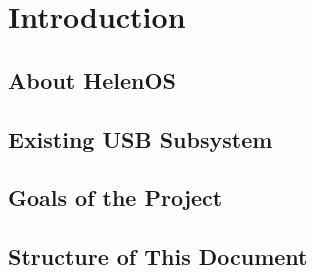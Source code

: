 \chapter{Introduction}

\section{About HelenOS}


\section{Existing USB Subsystem}


\section{Goals of the Project}


\section{Structure of This Document}

